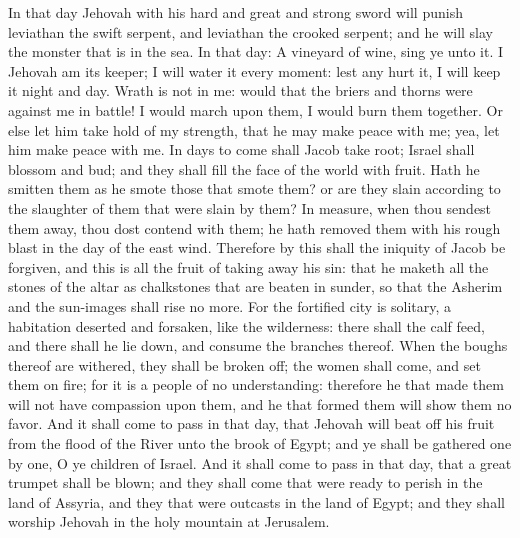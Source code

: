 In that day Jehovah with his hard and great and strong sword will punish leviathan the swift serpent, and leviathan the crooked serpent; and he will slay the monster that is in the sea.  In that day: A vineyard of wine, sing ye unto it. I Jehovah am its keeper; I will water it every moment: lest any hurt it, I will keep it night and day. Wrath is not in me: would that the briers and thorns were against me in battle! I would march upon them, I would burn them together. Or else let him take hold of my strength, that he may make peace with me; yea, let him make peace with me. In days to come shall Jacob take root; Israel shall blossom and bud; and they shall fill the face of the world with fruit.  Hath he smitten them as he smote those that smote them? or are they slain according to the slaughter of them that were slain by them? In measure, when thou sendest them away, thou dost contend with them; he hath removed them with his rough blast in the day of the east wind. Therefore by this shall the iniquity of Jacob be forgiven, and this is all the fruit of taking away his sin: that he maketh all the stones of the altar as chalkstones that are beaten in sunder, so that the Asherim and the sun-images shall rise no more. For the fortified city is solitary, a habitation deserted and forsaken, like the wilderness: there shall the calf feed, and there shall he lie down, and consume the branches thereof. When the boughs thereof are withered, they shall be broken off; the women shall come, and set them on fire; for it is a people of no understanding: therefore he that made them will not have compassion upon them, and he that formed them will show them no favor.  And it shall come to pass in that day, that Jehovah will beat off his fruit from the flood of the River unto the brook of Egypt; and ye shall be gathered one by one, O ye children of Israel.  And it shall come to pass in that day, that a great trumpet shall be blown; and they shall come that were ready to perish in the land of Assyria, and they that were outcasts in the land of Egypt; and they shall worship Jehovah in the holy mountain at Jerusalem. 

